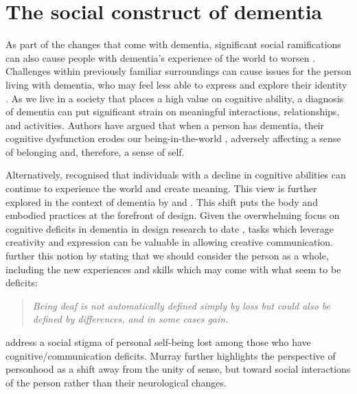 \section{The social construct of dementia}
\label{social construct}
As part of the changes that come with dementia, significant social ramifications can also cause people with dementia's experience of the world to worsen \citep{hampson_dementia:_2016}. Challenges within previously familiar surroundings can cause issues for the person living with dementia, who may feel less able to express and explore their identity \citep{john_killick_claire_craig_creativity_2012}. As we live in a society that places a high value on cognitive ability, a diagnosis of dementia can put significant strain on meaningful interactions, relationships, and activities. Authors have argued that when a person has dementia, their cognitive dysfunction erodes our being-in-the-world \citep{hampson_dementia:_2016}, adversely affecting a sense of belonging and, therefore, a sense of self.

Alternatively, \cite{gallagher_merleau-pontys_2010} recognised that individuals with a decline in cognitive abilities can continue to experience the world and create meaning. This view is further explored in the context of dementia by \cite{kontos_embodied_2005} and \cite{twigg_dress_2013}. This shift puts the body and embodied practices at the forefront of design. Given the overwhelming focus on cognitive deficits in dementia in design research to date \citep{lazar_critical_2017}, tasks which leverage creativity and expression can be valuable in allowing creative communication. \cite{bauman_l._&_murray_deaf_2014} further this notion by stating that we should consider the person as a whole, including the new experiences and skills which may come with what seem to be deficits:
\begin{quote}
    \textit{Being deaf is not automatically defined simply by loss but could also be defined by differences, and in some cases gain.}
\end{quote}

\cite{bauman_l._&_murray_deaf_2014} address a social stigma of personal self-being lost among those who have cognitive/communication deficits. Murray further highlights the perspective of personhood as a shift away from the unity of sense, but toward social interactions of the person rather than their neurological changes.

